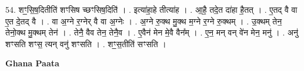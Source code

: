 \documentclass[17pt]{extarticle}
\begin{document}
54. शꣳ॒॒सि॒ष॒दितीति॑ शꣳसिष च्छꣳसिष॒दिति॑ । . इत्या॑हा॒हे तीत्या॑ह । . आ॒है॒ तदे॒त दा॑हा है॒तत् । . ए॒तद् वै वा ए॒त दे॒तद् वै । . वा अ॒ग्ने र॒ग्नेर् वै वा अ॒ग्नेः । . अ॒ग्ने रु॒क्थ मु॒क्थ म॒ग्ने र॒ग्ने रु॒क्थम् । . उ॒क्थम् तेन॒ तेनो॒क्थ मु॒क्थम् तेन॑ । . तेनै॒ वैव तेन॒ तेनै॒व । . ए॒वैन॑ मेन मे॒वै वैन᳚म् । . ए॒न॒ मन् वन् वे॑न मेन॒ मनु॑ । . अनु॑ शꣳसति शꣳस॒ त्यन् वनु॑ शꣳसति । . शꣳ॒॒स॒तीति॑ सꣳसति । \newline

\textbf{Ghana Paata } \newline
\end{document}
